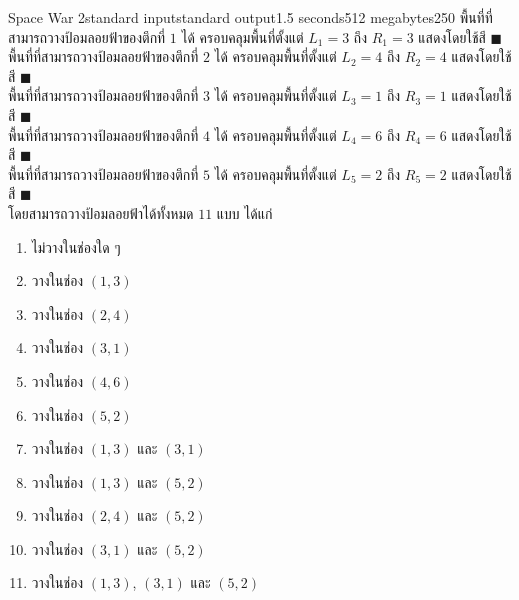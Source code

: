 \documentclass[11pt,a4paper]{article}
\begin{document}
\begin{problem}{Space War 2}{standard input}{standard output}{1.5 seconds}{512 megabytes}{250}
พื้นที่ที่สามารถวางป้อมลอยฟ้าของตึกที่ $1$ ได้ ครอบคลุมพื้นที่ตั้งแต่ $L_1=3$ ถึง $R_1=3$ แสดงโดยใช้สี \textcolor{blue!40!white}{$\blacksquare$} \\
พื้นที่ที่สามารถวางป้อมลอยฟ้าของตึกที่ $2$ ได้ ครอบคลุมพื้นที่ตั้งแต่ $L_2=4$ ถึง $R_2=4$ แสดงโดยใช้สี \textcolor{red!40!white}{$\blacksquare$} \\
พื้นที่ที่สามารถวางป้อมลอยฟ้าของตึกที่ $3$ ได้ ครอบคลุมพื้นที่ตั้งแต่ $L_3=1$ ถึง $R_3=1$ แสดงโดยใช้สี \textcolor{orange!40!white}{$\blacksquare$} \\
พื้นที่ที่สามารถวางป้อมลอยฟ้าของตึกที่ $4$ ได้ ครอบคลุมพื้นที่ตั้งแต่ $L_4=6$ ถึง $R_4=6$ แสดงโดยใช้สี \textcolor{green!40!white}{$\blacksquare$} \\
พื้นที่ที่สามารถวางป้อมลอยฟ้าของตึกที่ $5$ ได้ ครอบคลุมพื้นที่ตั้งแต่ $L_5=2$ ถึง $R_5=2$ แสดงโดยใช้สี \textcolor{magenta!40!white}{$\blacksquare$} \\

โดยสามารถวางป้อมลอยฟ้าได้ทั้งหมด $11$ แบบ ได้แก่
\begin{enumerate}
    \item ไม่วางในช่องใด ๆ
    \item วางในช่อง $(1,3)$
    \item วางในช่อง $(2,4)$
    \item วางในช่อง $(3,1)$
    \item วางในช่อง $(4,6)$
    \item วางในช่อง $(5,2)$
    \item วางในช่อง $(1,3)$ และ $(3,1)$
    \item วางในช่อง $(1,3)$ และ $(5,2)$
    \item วางในช่อง $(2,4)$ และ $(5,2)$
    \item วางในช่อง $(3,1)$ และ $(5,2)$
    \item วางในช่อง $(1,3)$, $(3,1)$ และ $(5,2)$
\end{enumerate}

\end{problem}
\end{document}

